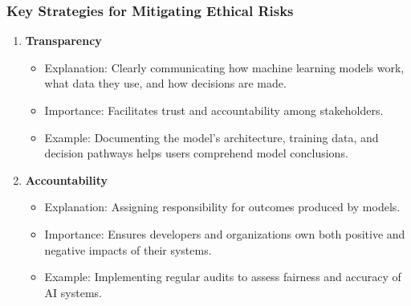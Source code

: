 \documentclass[aspectratio=169]{beamer}
\begin{document}
\begin{frame}[fragile]
    \frametitle{Key Strategies for Mitigating Ethical Risks}
    \begin{enumerate}
        \item \textbf{Transparency}
            \begin{itemize}
                \item Explanation: Clearly communicating how machine learning models work, what data they use, and how decisions are made.
                \item Importance: Facilitates trust and accountability among stakeholders.
                \item Example: Documenting the model’s architecture, training data, and decision pathways helps users comprehend model conclusions.
            \end{itemize}
        \item \textbf{Accountability}
            \begin{itemize}
                \item Explanation: Assigning responsibility for outcomes produced by models.
                \item Importance: Ensures developers and organizations own both positive and negative impacts of their systems.
                \item Example: Implementing regular audits to assess fairness and accuracy of AI systems.
            \end{itemize}
    \end{enumerate}
\end{frame}
\end{document}
